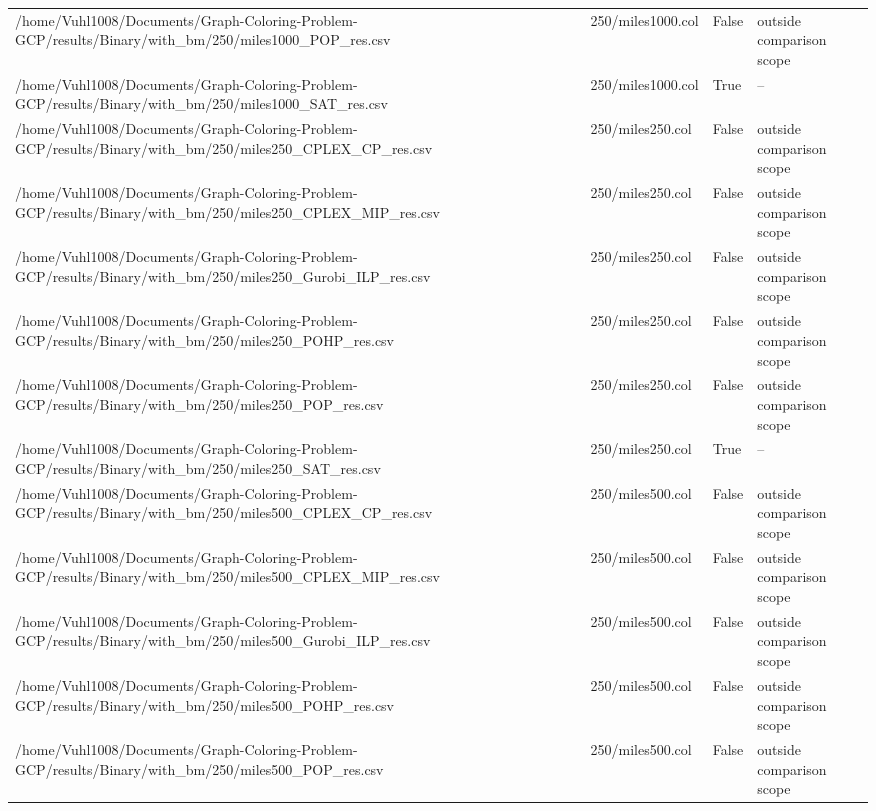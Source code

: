 \begin{table}[htbp]
\begin{tabular}{llll}
/home/Vuhl1008/Documents/Graph-Coloring-Problem-GCP/results/Binary/with\_bm/250/miles1000\_POP\_res.csv & 250/miles1000.col & False & outside comparison scope \\
/home/Vuhl1008/Documents/Graph-Coloring-Problem-GCP/results/Binary/with\_bm/250/miles1000\_SAT\_res.csv & 250/miles1000.col & True & -- \\
/home/Vuhl1008/Documents/Graph-Coloring-Problem-GCP/results/Binary/with\_bm/250/miles250\_CPLEX\_CP\_res.csv & 250/miles250.col & False & outside comparison scope \\
/home/Vuhl1008/Documents/Graph-Coloring-Problem-GCP/results/Binary/with\_bm/250/miles250\_CPLEX\_MIP\_res.csv & 250/miles250.col & False & outside comparison scope \\
/home/Vuhl1008/Documents/Graph-Coloring-Problem-GCP/results/Binary/with\_bm/250/miles250\_Gurobi\_ILP\_res.csv & 250/miles250.col & False & outside comparison scope \\
/home/Vuhl1008/Documents/Graph-Coloring-Problem-GCP/results/Binary/with\_bm/250/miles250\_POHP\_res.csv & 250/miles250.col & False & outside comparison scope \\
/home/Vuhl1008/Documents/Graph-Coloring-Problem-GCP/results/Binary/with\_bm/250/miles250\_POP\_res.csv & 250/miles250.col & False & outside comparison scope \\
/home/Vuhl1008/Documents/Graph-Coloring-Problem-GCP/results/Binary/with\_bm/250/miles250\_SAT\_res.csv & 250/miles250.col & True & -- \\
/home/Vuhl1008/Documents/Graph-Coloring-Problem-GCP/results/Binary/with\_bm/250/miles500\_CPLEX\_CP\_res.csv & 250/miles500.col & False & outside comparison scope \\
/home/Vuhl1008/Documents/Graph-Coloring-Problem-GCP/results/Binary/with\_bm/250/miles500\_CPLEX\_MIP\_res.csv & 250/miles500.col & False & outside comparison scope \\
/home/Vuhl1008/Documents/Graph-Coloring-Problem-GCP/results/Binary/with\_bm/250/miles500\_Gurobi\_ILP\_res.csv & 250/miles500.col & False & outside comparison scope \\
/home/Vuhl1008/Documents/Graph-Coloring-Problem-GCP/results/Binary/with\_bm/250/miles500\_POHP\_res.csv & 250/miles500.col & False & outside comparison scope \\
/home/Vuhl1008/Documents/Graph-Coloring-Problem-GCP/results/Binary/with\_bm/250/miles500\_POP\_res.csv & 250/miles500.col & False & outside comparison scope \\

\end{tabular}
\end{table}

